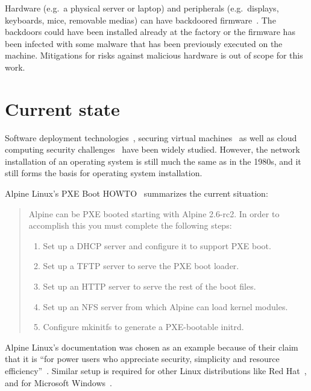 
Hardware (e.g.\ a physical server or laptop) and peripherals (e.g.\
displays, keyboards, mice, removable medias) can have backdoored
firmware~\cite{swierczynski2016interdiction}. The backdoors could have
been installed already at the factory or the firmware has been
infected with some malware that has been previously executed on the
machine. Mitigations for risks against malicious hardware is out of
scope for this work.


\section{Current state}

Software deployment technologies~\cite{SoftDep}, securing virtual
machines~\cite{Garfinkel2005} as well as cloud computing security
challenges~\cite{Owens2010}\cite{Hashizume2013} have been widely
studied. However, the network installation of an operating system is
still much the same as in the 1980s, and it still forms the basis for
operating system installation.

Alpine Linux's PXE Boot HOWTO~\cite{alpine-pxe-boot-howto} summarizes
the current situation:

\begin{quote}
Alpine can be PXE booted starting with Alpine 2.6-rc2. In order to
accomplish this you must complete the following steps:

\begin{enumerate}
\item Set up a DHCP server and configure it to support PXE boot.
\item Set up a TFTP server to serve the PXE boot loader.
\item Set up an HTTP server to serve the rest of the boot files.
\item Set up an NFS server from which Alpine can load kernel modules.
\item Configure mkinitfs to generate a PXE-bootable initrd.
\end{enumerate}
\end{quote}

Alpine Linux's documentation was chosen as an example because of their
claim that it is ``for power users who appreciate security, simplicity
and resource efficiency''~\cite{alpine-about}. Similar setup is
required for other Linux distributions like Red
Hat~\cite{redhat-network-install}, and for Microsoft
Windows~\cite{windows-network-install}.

